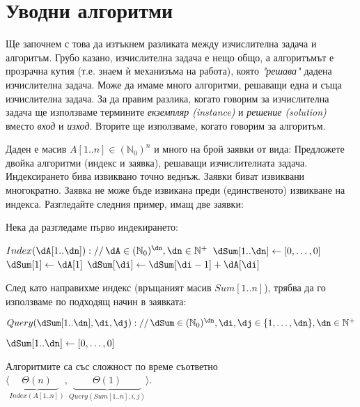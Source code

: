\section{Уводни алгоритми}

Ще започнем с това да изтъкнем разликата между изчислителна задача и алгоритъм. Грубо казано, изчислителна задача е нещо общо, а алгоритъмът е прозрачна кутия (т.е. знаем ѝ механизъма на работа), която \emph{"решава"} дадена изчислителна задача. Може да имаме много алгоритми, решаващи една и съща изчислителна задача. За да правим разлика, когато говорим за изчислителна задача ще използваме термините \emph{екземпляр (instance)} и \emph{решение (solution)} вместо \emph{вход} и \emph{изход}. Вторите ще използваме, когато говорим за алгоритъм.\\

\begin{problem}
	Даден е масив $A[1..n]\in(\mathbb{N}_0)^n$ и много на брой заявки от вида:
	Предложете двойка алгоритми (индекс и заявка), решаващи изчислителната задача. Индексирането бива извиквано точно веднъж. Заявки биват извиквани многократно. Заявка не може бъде извикана преди (единственото) извикване на индекса. Разгледайте следния пример, имащ две заявки:
\end{problem}

\begin{solution}
	Нека да разгледаме първо индекирането:
	\begin{pseudocode}
		
		$Index(\dA[1..\dn])://\,\dA\in(\mathbb{N}_0)^{\dn},\dn\in\mathbb{N}^+$
		\Mybegin
		{
			$\dSum[1..\dn]\leftarrow[0,\dots,0]$\;
			$\dSum[1]\leftarrow\dA[1]$\;
			{
				$\dSum[\di]\leftarrow\dSum[\di-1]+\dA[\di]$\;
			}
			\KwRet{$\dSum[1..\dn]$}\;
		}
	\end{pseudocode}
	След като направихме индекс (връщаният масив $Sum[1..n]$), трябва да го използваме по подходящ начин в заявката:
	\begin{pseudocode}
		\SetKwData{dn}{n}
		\SetKwData{dSum}{Sum}
		\SetKwData{di}{i}
		\SetKwData{dj}{j}
		
		$Query(\dSum[1..\dn],\di,\dj)://\,\dSum\in(\mathbb{N}_0)^{\dn},\di,\dj\in\{1,\dots,\dn\},\dn\in\mathbb{N}^+$
		\Mybegin
		{
			$\dSum[1..\dn]\leftarrow[0,\dots,0]$\;
			
			\If{$\di<1$ \Or $\dj>\dn$}{\KwRet{$-1$};}
			\If{$\di>\dj$}{\KwRet{$0$};}
			\If{$\di=1$}{\KwRet{$\dSum[\dj]$};}
			
			\KwRet{$\dSum[\dj]-\dSum[\di-1]$}\;
		}
	\end{pseudocode}
	Алгоритмите са със сложност по време съответно $\langle\underbrace{\ \ \ \Theta(n)\ \ \ }_{Index(A[1..n])},\underbrace{\quad\quad\Theta(1)\quad\quad}_{Query(Sum[1..n],i,j)}\rangle$.
\end{solution}\vspace{0.5cm}

